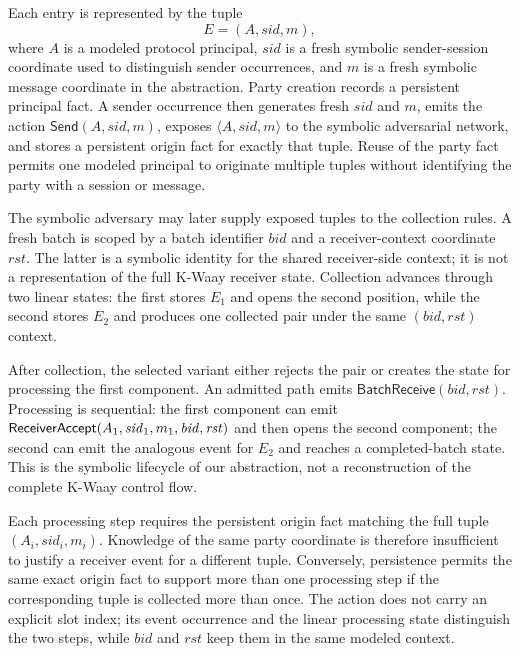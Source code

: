Each entry is represented by the tuple
\begin{equation}
  E=(A,\mathit{sid},m),
  \label{eq:model-entry-tuple}
\end{equation}
where $A$ is a modeled protocol principal, $\mathit{sid}$ is a fresh
symbolic sender-session coordinate used to distinguish sender occurrences,
and $m$ is a fresh symbolic message coordinate in the abstraction. Party
creation records a persistent principal fact. A sender
occurrence then generates fresh $\mathit{sid}$ and $m$, emits the action
\(\mathsf{Send}(A,\mathit{sid},m)\), exposes
\(\langle A,\mathit{sid},m\rangle\) to the symbolic adversarial network, and
stores a persistent origin fact for exactly that tuple. Reuse of the party
fact permits one modeled principal to originate multiple tuples without
identifying the party with a session or message.

The symbolic adversary may later supply exposed tuples to the collection
rules. A fresh batch is scoped by a batch identifier $\mathit{bid}$ and a
receiver-context coordinate $\mathit{rst}$. The latter is a symbolic identity
for the shared receiver-side context; it is not a representation of the full
K-Waay receiver state. Collection advances through two linear states: the
first stores \(E_1\) and opens the second position, while the second stores
\(E_2\) and produces one collected pair under the same
\((\mathit{bid},\mathit{rst})\) context.

After collection, the selected variant either rejects the pair or creates the
state for processing the first component. An admitted path emits
\(\mathsf{BatchReceive}(\mathit{bid},\mathit{rst})\). Processing is sequential:
the first component can emit
\(\textsf{ReceiverAccept}(A_1,\mathit{sid}_1,m_1,\mathit{bid},\mathit{rst})\) and then
opens the second component; the second can emit the analogous event for
\(E_2\) and reaches a completed-batch state. This is the symbolic lifecycle of
our abstraction, not a reconstruction of the complete K-Waay control flow.

Each processing step requires the persistent origin fact matching the full
tuple \((A_i,\mathit{sid}_i,m_i)\). Knowledge of the same party coordinate is
therefore insufficient to justify a receiver event for a different tuple.
Conversely, persistence permits the same exact origin fact to support more
than one processing step if the corresponding tuple is collected more than
once. The \receiveraccept action does not carry an explicit slot index; its
event occurrence and the linear processing state distinguish the two steps,
while $\mathit{bid}$ and $\mathit{rst}$ keep them in the same modeled context.


